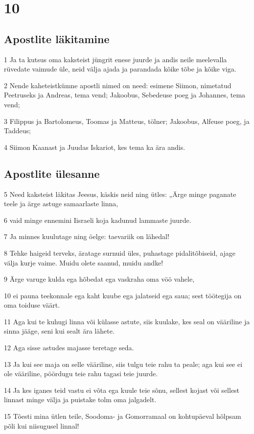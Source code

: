 \chapter{10}

\section*{Apostlite läkitamine}

\par 1 Ja ta kutsus oma kaksteist jüngrit enese juurde ja andis neile meelevalla rüvedate vaimude üle, neid välja ajada ja parandada kõike tõbe ja kõike viga.
\par 2 Nende kaheteistkümne apostli nimed on need: esimene Siimon, nimetatud Peetruseks ja Andreas, tema vend; Jakoobus, Sebedeuse poeg ja Johannes, tema vend;
\par 3 Filippus ja Bartolomeus, Toomas ja Matteus, tölner; Jakoobus, Alfeuse poeg, ja Taddeus;
\par 4 Siimon Kaanast ja Juudas Iskariot, kes tema ka ära andis.

\section*{Apostlite ülesanne}

\par 5 Need kaksteist läkitas Jeesus, käskis neid ning ütles: „Ärge minge paganate teele ja ärge astuge samaarlaste linna,
\par 6 vaid minge ennemini Iisraeli koja kadunud lammaste juurde.
\par 7 Ja minnes kuulutage ning öelge: taevariik on lähedal!
\par 8 Tehke haigeid terveks, äratage surnuid üles, puhastage pidalitõbiseid, ajage välja kurje vaime. Muidu olete saanud, muidu andke!
\par 9 Ärge varuge kulda ega hõbedat ega vaskraha oma vöö vahele,
\par 10 ei pauna teekonnale ega kaht kuube ega jalatseid ega saua; sest töötegija on oma toiduse väärt.
\par 11 Aga kui te kuhugi linna või külasse astute, siis kuulake, kes seal on vääriline ja sinna jääge, seni kui sealt ära lähete.
\par 12 Aga sisse astudes majasse teretage seda.
\par 13 Ja kui see maja on selle vääriline, siis tulgu teie rahu ta peale; aga kui see ei ole vääriline, pöördugu teie rahu tagasi teie juurde.
\par 14 Ja kes iganes teid vastu ei võta ega kuule teie sõnu, sellest kojast või sellest linnast minge välja ja puistake tolm oma jalgadelt.
\par 15 Tõesti mina ütlen teile, Soodoma- ja Gomorramaal on kohtupäeval hõlpsam põli kui niisugusel linnal!

